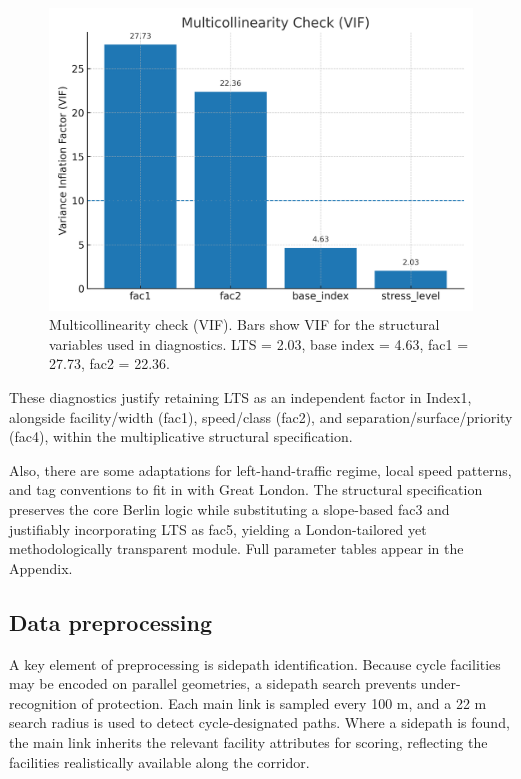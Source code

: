 \documentclass[
  12pt,
  oneside]{book}
\begin{document}
\begin{figure}

{\centering \includegraphics[width=0.75\linewidth]{general_images/vif1} 

}

\caption{Multicollinearity check (VIF). Bars show VIF for the structural variables used in diagnostics. LTS = 2.03, base index = 4.63, fac1 = 27.73, fac2 = 22.36.}\label{fig:vif1}
\end{figure}

These diagnostics justify retaining LTS as an independent factor in Index1, alongside facility/width (fac1), speed/class (fac2), and separation/surface/priority (fac4), within the multiplicative structural specification.

Also, there are some adaptations for left-hand-traffic regime, local speed patterns, and tag conventions to fit in with Great London.
The structural specification preserves the core Berlin logic while substituting a slope-based fac3 and justifiably incorporating LTS as fac5, yielding a London-tailored yet methodologically transparent module. Full parameter tables appear in the Appendix.

\subsection{Data preprocessing}\label{data-preprocessing}

A key element of preprocessing is sidepath identification. Because cycle facilities may be encoded on parallel geometries, a sidepath search prevents under-recognition of protection. Each main link is sampled every 100 m, and a 22 m search radius is used to detect cycle-designated paths. Where a sidepath is found, the main link inherits the relevant facility attributes for scoring, reflecting the facilities realistically available along the corridor.
\end{document}
